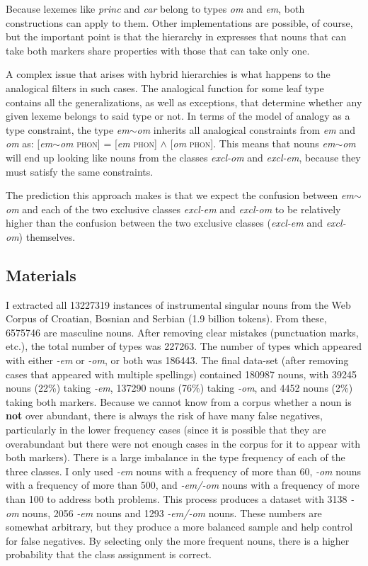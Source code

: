 Because lexemes like \textit{princ} and \textit{car} belong to types \textit{om} and \textit{em}, both constructions can apply to them. Other implementations are possible, of course, but the important point is that the hierarchy in  expresses that nouns that can take both markers share properties with those that can take only one.

A complex issue that arises with hybrid hierarchies is what happens to the analogical filters in such cases. The analogical function for some leaf type contains all the generalizations, as well as exceptions, that determine whether any given lexeme belongs to said type or not. In terms of the model of analogy as a type constraint, the type \textit{em$\sim$om} inherits all analogical constraints from \textit{em} and \textit{om} as: [\textit{em$\sim$om} \textsc{phon}] = [\textit{em} \textsc{phon}] $\land$ [\textit{om} \textsc{phon}]. This means that nouns \textit{em$\sim$om} will end up looking like nouns from the classes \textit{excl-om} and \textit{excl-em}, because they must satisfy the same constraints.

The prediction this approach makes is that we expect the confusion between \textit{em$\sim$om} and each of the two exclusive classes \textit{excl-em} and \textit{excl-om} to be relatively higher than the confusion between the two exclusive classes (\textit{excl-em} and \textit{excl-om}) themselves.

\subsection{Materials}

I extracted all 13227319 instances of instrumental singular nouns from the Web Corpus of Croatian, Bosnian and Serbian \autocite{ljubesic14-bs} (1.9 billion tokens). From these, 6575746 are masculine nouns. After removing clear mistakes (punctuation marks, etc.), the total  number of types was 227263. The number of types which appeared with either \textit{-em} or \textit{-om}, or both was 186443. The final data-set (after removing cases that appeared with multiple spellings) contained 180987 nouns, with 39245 nouns (22\%) taking \textit{-em}, 137290 nouns (76\%) taking \textit{-om}, and 4452 nouns (2\%) taking both markers. Because we cannot know from a corpus whether a noun is \textbf{not} over abundant, there is always the risk of have many false negatives, particularly in the lower frequency cases (since it is possible that they are overabundant but there were not enough cases in the corpus for it to appear with both markers). There is a large imbalance in the type frequency of each of the three classes. I only used \textit{-em} nouns with a frequency of more than 60, \textit{-om} nouns with a frequency of more than 500, and \textit{-em/-om} nouns with a frequency of more than 100 to address both problems. This process produces a dataset with 3138 \textit{-om} nouns, 2056 \textit{-em} nouns and 1293 \textit{-em/-om} nouns. These numbers are somewhat arbitrary, but they produce a more balanced sample and help control for false negatives. By selecting only the more frequent nouns, there is a higher probability that the class assignment is correct.

